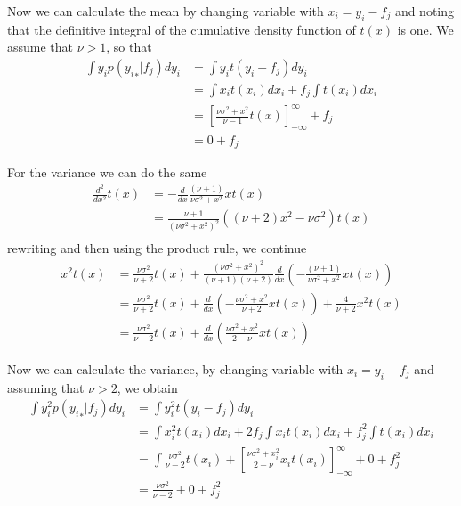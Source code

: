 \documentclass[5p,11pt]{article}
\begin{document}
Now we can calculate the mean by changing variable with $x_i = y_i-f_j$ and noting that the definitive integral of the cumulative density function of $t(x)$ is one. We assume that $\nu > 1$, so that
\begin{equation}
    \begin{aligned}
        \int y_i p({y_i}_*|f_j) dy_i &= \int y_i t(y_i-f_j) dy_i\\
        &= \int x_i t(x_i) dx_i + f_j \int t(x_i) dx_i\\
        &= \left[\frac{\nu\sigma^2+x^2}{\nu-1} t(x)\right]_{-\infty}^\infty + f_j\\
        &= 0 + f_j
     \end{aligned}
\end{equation}

For the variance we can do the same
\begin{equation}
    \begin{aligned}
        \frac{d^2}{dx^2}t(x) &= -\frac{d}{dx} \frac{(\nu+1)}{\nu\sigma^2+x^2}xt(x)\\
        &= \frac{\nu+1}{\left(\nu\sigma^2 + x^2\right)^2}\left((\nu+2)x^2 - \nu\sigma^2\right)t(x)\\
     \end{aligned}
\end{equation}
rewriting and then using the product rule, we continue
\begin{equation}
    \begin{aligned}
        x^2t(x) &= \frac{\nu\sigma^2}{\nu+2}t(x) + \frac{\left(\nu\sigma^2+x^2\right)^2}{(\nu+1)(\nu+2)}\frac{d}{dx}\left(-\frac{(\nu+1)}{\nu\sigma^2+x^2}xt(x)\right)\\
        &= \frac{\nu\sigma^2}{\nu+2}t(x) + \frac{d}{dx}\left(-\frac{\nu\sigma^2+x^2}{\nu+2}xt(x)\right) + \frac{4}{\nu+2}x^2t(x)\\
        &= \frac{\nu\sigma^2}{\nu-2}t(x) + \frac{d}{dx}\left(\frac{\nu\sigma^2+x^2}{2-\nu}xt(x)\right)
     \end{aligned}
\end{equation}

Now we can calculate the variance, by changing variable with $x_i = y_i-f_j$ and assuming that $\nu > 2$, we obtain
\begin{equation}
    \begin{aligned}
        \int y_i^2 p({y_i}_*|f_j) dy_i &= \int y_i^2 t(y_i-f_j) dy_i\\
        &= \int x_i^2 t(x_i) dx_i + 2f_j \int x_it(x_i)dx_i + f_j^2 \int t(x_i) dx_i\\
        &= \int \frac{\nu\sigma^2}{\nu-2}t(x_i) + \left[\frac{\nu\sigma^2+x_i^2}{2-\nu}x_it(x_i)\right]_{-\infty}^\infty + 0 + f_j^2\\
        &= \frac{\nu\sigma^2}{\nu-2} + 0 + f_j^2
     \end{aligned}
\end{equation}
\end{document}
